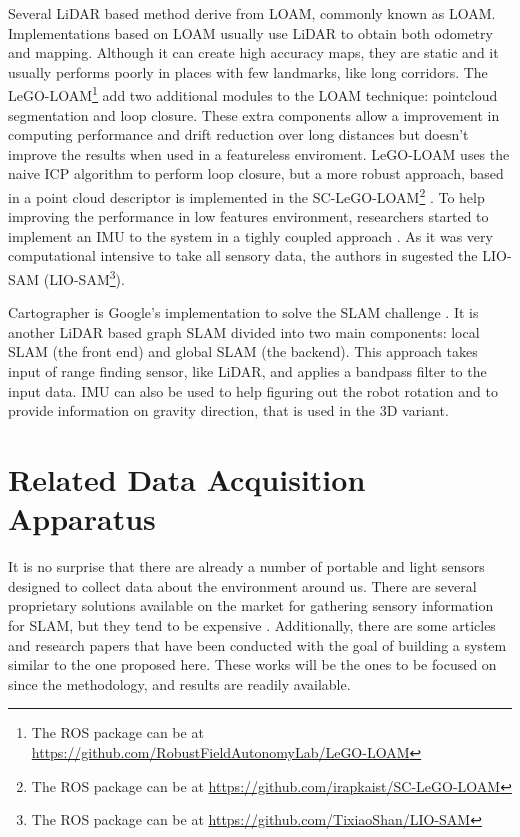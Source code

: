 Several \acs*{LiDAR} based method derive from \acl*{LOAM}, commonly known as \acs*{LOAM}. Implementations based on \acs*{LOAM} usually use \acs*{LiDAR} to obtain both odometry and mapping. Although it can create high accuracy maps, they are static and it usually performs poorly in places with few landmarks, like long corridors. The LeGO-LOAM\footnote{The \acs*{ROS} package can be at \url{https://github.com/RobustFieldAutonomyLab/LeGO-LOAM}} add two additional modules to the \acs*{LOAM} technique: pointcloud segmentation and loop closure. These extra components allow a improvement in computing performance and drift reduction over long distances but doesn't improve the results when used in a featureless enviroment. LeGO-LOAM uses the naive \acs*{ICP} algorithm to perform loop closure, but a more robust approach, based in a point cloud descriptor is implemented in the SC-LeGO-LOAM\footnote{The \acs*{ROS} package can be at \url{https://github.com/irapkaist/SC-LeGO-LOAM}} \cite{kim_scan_2018}. To help improving the performance in low features environment, researchers started to implement an \acs*{IMU} to the system in a tighly coupled approach \cite{ye2019tightly, xu_fast-lio_2021,xu_fast-lio2_2021}. As it was very computational intensive to take all sensory data, the authors in \cite{liosam2020shan} sugested the \acl*{LIO-SAM} (\acs*{LIO-SAM}\footnote{The \acs*{ROS} package can be at \url{https://github.com/TixiaoShan/LIO-SAM}}).

Cartographer is Google's implementation to solve the \acs*{SLAM} challenge \cite{hess_real-time_2016}. It is another \acs*{LiDAR} based graph \acs*{SLAM} divided into two main components: local \acs*{SLAM} (the front end) and global \acs*{SLAM} (the backend). This approach takes input of range finding sensor, like \acs*{LiDAR}, and applies a bandpass filter to the input data. \acs*{IMU} can also be used to help figuring out the robot rotation and to provide information on gravity direction, that is used in the 3D variant.
 
\section{Related Data Acquisition Apparatus}

It is no surprise that there are already a number of portable and light sensors designed to collect data about the environment around us. There are several proprietary solutions available on the market for gathering sensory information for \acs*{SLAM}, but they tend to be expensive \cite{libackpack_C50, libackpack_DGC50}. Additionally, there are some articles and research papers that have been conducted with the goal of building a system similar to the one proposed here. These works will be the ones to be focused on since the methodology, and results are readily available.

